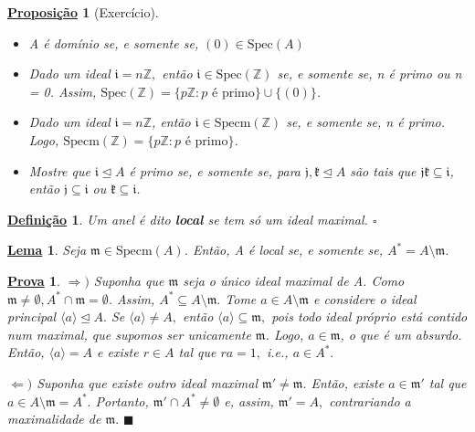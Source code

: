 \documentclass{article}
\newtheorem*{def*}{\underline{Defini\c c\~ao}}
\newtheorem*{lemma*}{\underline{Lema}}
\newtheorem*{prop*}{\underline{Proposi\c c\~ao}}
\newtheorem*{proof*}{\underline{Prova}}
\renewcommand\qedsymbol{$\blacksquare$}
\begin{document}
\begin{prop*}[Exercício]
  \begin{itemize}
    \item[1)] A é domínio se, e somente se, \((0)\in \mathrm{Spec}(A)\)
    \item[2)] Dado um ideal \(\mathfrak{i} = n \mathbb{Z},\) então \(\mathfrak{i}\in \mathrm{Spec}(\mathbb{Z})\) se, e somente se,
      n é primo ou n = 0. Assim, \(\mathrm{Spec}(\mathbb{Z}) = \{p \mathbb{Z}: p \text{ é primo}\}\cup \{(0)\}\).
    \item[3)] Dado um ideal \(\mathfrak{i} = n \mathbb{Z}\), então \(\mathfrak{i}\in \mathrm{Specm}(\mathbb{Z})\) se, e somente se,
      n é primo. Logo, \(\mathrm{Specm}(\mathbb{Z}) = \{p \mathbb{Z}:p \text{ é primo}\}\).
    \item[4)] Mostre que \(\mathfrak{i}\trianglelefteq A\) é primo se, e somente se, para \(\mathfrak{j}, \mathfrak{k}\trianglelefteq A\) são tais que \(\mathfrak{j}\mathfrak{k}\subseteq \mathfrak{i}\), então 
 \(\mathfrak{j}\subseteq \mathfrak{i}\) ou \(\mathfrak{k}\subseteq \mathfrak{i}\).
  \end{itemize}
\end{prop*}
\begin{def*}
  Um anel é dito \textbf{local} se tem só um ideal maximal. \(\square\)
\end{def*}
\begin{lemma*}
  Seja \(\mathfrak{m}\in \mathrm{Specm}(A)\). Então, A é local se, e somente se, \(A^{*} = A\setminus{\mathfrak{m}}\).
\end{lemma*}
\begin{proof*}
  \(\Rightarrow )\) Suponha que \(\mathfrak{m}\) seja o único ideal maximal de A. Como \(\mathfrak{m} \neq\emptyset, A^{*}\cap \mathfrak{m} = \emptyset\).
  Assim, \(A^{*}\subseteq{A\setminus{\mathfrak{m}}}.\) Tome \(a\in A\setminus{\mathfrak{m}}\) e considere o ideal principal \(\langle a \rangle \trianglelefteq{A}.\)
  Se \(\langle a \rangle\neq A,\) então \(\langle a \rangle \subseteq{\mathfrak{m}},\) pois todo ideal próprio está contido num maximal, que supomos ser unicamente \(\mathfrak{m}\).
  Logo, \(a\in \mathfrak{m}\), o que é um absurdo. Então, \(\langle a \rangle = A\) e existe \(r\in A\) tal que \(ra = 1,\) i.e., \(a\in A^{*}.\)

  \(\Leftarrow )\) Suponha que existe outro ideal maximal \(\mathfrak{m}'\neq \mathfrak{m}.\) Então, existe \(a\in \mathfrak{m}'\)
  tal que \(a\in A\setminus{\mathfrak{m}} = A^{*}.\) Portanto, \(\mathfrak{m}'\cap A^{*} \neq\emptyset\) e, assim, \(\mathfrak{m}' = A,\)
  contrariando a maximalidade de \(\mathfrak{m}.\) \qedsymbol
\end{proof*}
\end{document}

